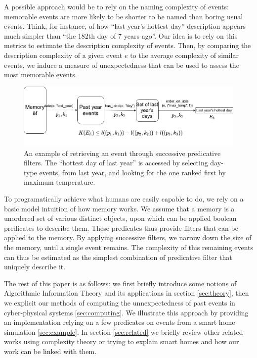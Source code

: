 \documentclass[conference]{IEEEtran}
\begin{document}
A possible approach would be to rely on the naming complexity of events: memorable events are more likely to be shorter to be named than boring usual events. Think, for instance, of how ``last year's hottest day'' description appears much simpler than ``the 182th day of 7 years ago''. Our idea is to rely on this metrics to estimate the description complexity of events. Then, by comparing the description complexity of a given event $e$ to the average complexity of similar events, we induce a measure of unexpectedness that can be used to assess the most memorable events.

\begin{figure}[ht]
  \centering
  \includegraphics[width=\linewidth]{figures/filters}
  \caption{An example of retrieving an event through successive predicative filters. The ``hottest day of last year'' is accessed by selecting day-type events, from last year, and looking for the one ranked first by maximum temperature.}
  \label{fig:filters}
\end{figure}

To programatically achieve what humans are easily capable to do, we rely on a basic model intuition of how memory works. We assume that a memory is a unordered set of various distinct objects, upon which can be applied boolean predicates to describe them. These predicates thus provide filters that can be applied to the memory. By applying successive filters, we narrow down the size of the memory, until a single event remains. The complexity of this remaining events can thus be estimated as the simplest combination of predicative filter that uniquely describe it.

The rest of this paper is as follows: we first briefly introduce some notions of Algorithmic Information Theory and its applications in section \ref{sec:theory}, then we explicit our methods of computing the unnexpectedness of past events in cyber-physical systems \ref{sec:computing}. We illustrate this approach by providing an implementation relying on a few predicates on events from a smart home simulation \ref{sec:example}. In section \ref{sec:related} we briefly review other related works using complexity theory or trying to explain smart homes and how our work can be linked with them.
\end{document}

